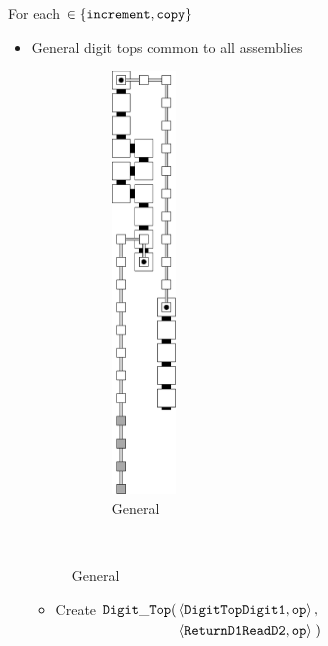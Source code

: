         For each {\inc} $\in \{ {\tt increment, copy } \}$
        \begin{itemize}
            \item General digit tops common to all assemblies

            \begin{figure}[H]
                \centering
                \begin{subfigure}[t]{0.2\textwidth}
                    \centering
                    \includegraphics[width=0.2\textwidth]{digit_tops/digit_top_general}
                    \caption{\label{fig:digit_tops/digit_top_general} General }
                \end{subfigure}%
                ~
            \end{figure}

            \begin{itemize}
                \item Create
                $\begin{aligned}[t]
                    {\tt Digit\_Top}(& \left \langle {\tt DigitTopDigit1}, {\tt op} \right\rangle, & \\
                          & \left \langle {\tt ReturnD1ReadD2}, {\tt op} \right\rangle \;)
                \end{aligned}$
                \vspace{.5cm}


\end{itemize}
\end{itemize}
